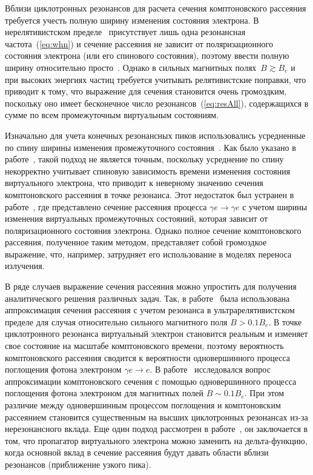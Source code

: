 Вблизи 
циклотронных резонансов для расчета сечения 
комптоновского рассеяния требуется учесть полную 
ширину изменения состояния электрона. В нерелятивистском 
пределе~\cite{Canuto:1971} присутствует лишь одна резонансная 
частота~(\ref{eq:whn}) и сечение рассеяния
не зависит от поляризационного состояния электрона (или его спинового состояния), 
поэтому ввести полную ширину относительно просто~\cite{Daugherty:1989}. Однако 
в сильных магнитных полях~$B\gtrsim B_e$ и при высоких энергиях частиц 
требуется учитывать релятивистские поправки, что приводит к тому, что выражение 
для  сечения 
становится очень громоздким, поскольку оно имеет бесконечное число 
резонансов~(\ref{eq:resAll}), 
содержащихся в сумме по всем промежуточным виртуальным состояниям.

Изначально для учета конечных резонансных пиков использовались усредненные по спину ширины изменения промежуточного состояния~\cite{Gonthier:2000, Holodov:2000}. 
Как было указано в работе~\cite{Gonthier:2014}, такой подход не является 
точным, поскольку усреднение по спину некорректно учитывает спиновую 
зависимость времени изменения состояния виртуального электрона, что приводит к неверному значению сечения комптоновского рассеяния в точке 
резонанса. Этот недостаток был устранен в работе~\cite{Mushtukov:2016}, где 
представлено сечение рассеяния процесса $\gamma e\to \gamma e$ с учетом 
ширины изменения виртуальных промежуточных состояний, которая 
зависит от 
поляризационного состояния электрона. 
Однако полное сечение комптоновского рассеяния, полученное таким методом, 
представляет собой громоздкое выражение, что, например, затрудняет его 
использование в моделях переноса излучения. 

В ряде случаев выражение сечения рассеяния можно упростить для получения 
аналитического 
решения различных задач. 
Так, в работе~\cite{Gonthier:2000} была использована 
аппроксимация сечения рассеяния с учетом резонанса в ультрарелятивистском 
пределе для случая относительно сильного магнитного поля $B>0.1 B_e$. В точке 
циклотронного резонанса виртуальный электрон становится реальным и изменяет свое состояние 
на масштабе комптоновского времени, поэтому вероятность
комптоновского рассеяния сводится к вероятности одновершинного процесса 
поглощения фотона электроном $\gamma 
e \to e$. В 
работе~\cite{Harding:1991} исследовался вопрос аппроксимации комптоновского 
сечения с помощью одновершинного процесса поглощения фотона электроном для 
магнитных полей 
$B\sim 
0.1B_e$. При этом различие между одновершинным процессом поглощения и комптоновским 
рассеянием становится существенным на высших циклотронных резонансах из-за 
нерезонансного вклада. Еще один подход рассмотрен в 
работе~\cite{Rumyantsev:2017}, он заключается в том, что пропагатор 
виртуального электрона можно заменить 
на дельта-функцию, когда основной вклад 
в сечение рассеяния будут давать области вблизи резонансов (приближение узкого 
пика). 
 
